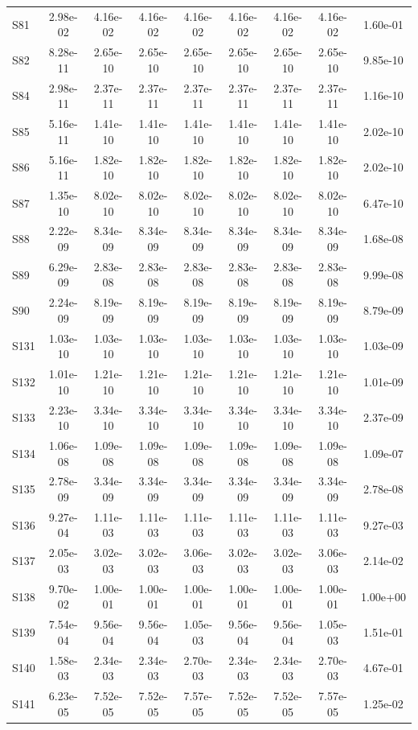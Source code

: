 {\begin{longtable}{l S[table-format=1.2e+2] S[table-format=1.2e+2] S[table-format=1.2e+2] S[table-format=1.2e+2] S[table-format=1.2e+2] S[table-format=1.2e+2] S[table-format=1.2e+2] S[table-format=1.2e+2]}
S81 & 2.98e-02 & 4.16e-02 & 4.16e-02 & 4.16e-02 & 4.16e-02 & 4.16e-02 & 4.16e-02 & 1.60e-01 \\
S82 & 8.28e-11 & 2.65e-10 & 2.65e-10 & 2.65e-10 & 2.65e-10 & 2.65e-10 & 2.65e-10 & 9.85e-10 \\
S84 & 2.98e-11 & 2.37e-11 & 2.37e-11 & 2.37e-11 & 2.37e-11 & 2.37e-11 & 2.37e-11 & 1.16e-10 \\
S85 & 5.16e-11 & 1.41e-10 & 1.41e-10 & 1.41e-10 & 1.41e-10 & 1.41e-10 & 1.41e-10 & 2.02e-10 \\
S86 & 5.16e-11 & 1.82e-10 & 1.82e-10 & 1.82e-10 & 1.82e-10 & 1.82e-10 & 1.82e-10 & 2.02e-10 \\
S87 & 1.35e-10 & 8.02e-10 & 8.02e-10 & 8.02e-10 & 8.02e-10 & 8.02e-10 & 8.02e-10 & 6.47e-10 \\
S88 & 2.22e-09 & 8.34e-09 & 8.34e-09 & 8.34e-09 & 8.34e-09 & 8.34e-09 & 8.34e-09 & 1.68e-08 \\
S89 & 6.29e-09 & 2.83e-08 & 2.83e-08 & 2.83e-08 & 2.83e-08 & 2.83e-08 & 2.83e-08 & 9.99e-08 \\
S90 & 2.24e-09 & 8.19e-09 & 8.19e-09 & 8.19e-09 & 8.19e-09 & 8.19e-09 & 8.19e-09 & 8.79e-09 \\
S131 & 1.03e-10 & 1.03e-10 & 1.03e-10 & 1.03e-10 & 1.03e-10 & 1.03e-10 & 1.03e-10 & 1.03e-09 \\
S132 & 1.01e-10 & 1.21e-10 & 1.21e-10 & 1.21e-10 & 1.21e-10 & 1.21e-10 & 1.21e-10 & 1.01e-09 \\
S133 & 2.23e-10 & 3.34e-10 & 3.34e-10 & 3.34e-10 & 3.34e-10 & 3.34e-10 & 3.34e-10 & 2.37e-09 \\
S134 & 1.06e-08 & 1.09e-08 & 1.09e-08 & 1.09e-08 & 1.09e-08 & 1.09e-08 & 1.09e-08 & 1.09e-07 \\
S135 & 2.78e-09 & 3.34e-09 & 3.34e-09 & 3.34e-09 & 3.34e-09 & 3.34e-09 & 3.34e-09 & 2.78e-08 \\
S136 & 9.27e-04 & 1.11e-03 & 1.11e-03 & 1.11e-03 & 1.11e-03 & 1.11e-03 & 1.11e-03 & 9.27e-03 \\
S137 & 2.05e-03 & 3.02e-03 & 3.02e-03 & 3.06e-03 & 3.02e-03 & 3.02e-03 & 3.06e-03 & 2.14e-02 \\
S138 & 9.70e-02 & 1.00e-01 & 1.00e-01 & 1.00e-01 & 1.00e-01 & 1.00e-01 & 1.00e-01 & 1.00e+00 \\
S139 & 7.54e-04 & 9.56e-04 & 9.56e-04 & 1.05e-03 & 9.56e-04 & 9.56e-04 & 1.05e-03 & 1.51e-01 \\
S140 & 1.58e-03 & 2.34e-03 & 2.34e-03 & 2.70e-03 & 2.34e-03 & 2.34e-03 & 2.70e-03 & 4.67e-01 \\
S141 & 6.23e-05 & 7.52e-05 & 7.52e-05 & 7.57e-05 & 7.52e-05 & 7.52e-05 & 7.57e-05 & 1.25e-02 \\

\end{longtable}}
